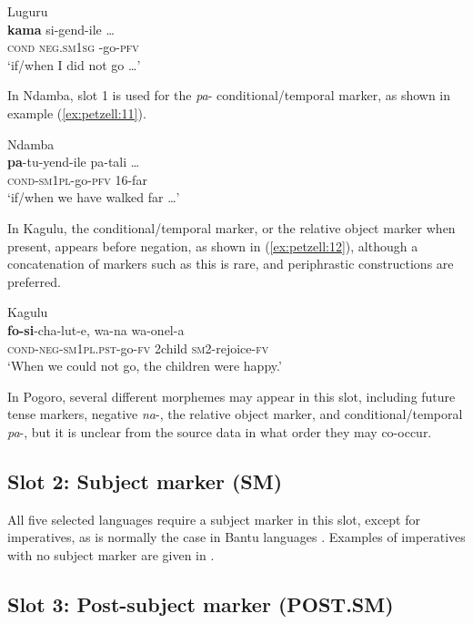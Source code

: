 \documentclass[output=paper,
            colorlinks, citecolor=brown
            ,draftmode
		  ]{langscibook}
\begin{document}
\ex\label{ex:petzell:10}Luguru\\
\gll \textbf{kama}   si-gend-ile \ldots\\
\textsc{cond}  \textsc{neg.sm}1\textsc{sg} -go-\textsc{pfv} \\
\glt `if/when I did not go \ldots'
\z


In Ndamba, slot 1 is used for the \textit{pa}{}- conditional/temporal marker, as shown in example (\ref{ex:petzell:11}).


\ea\label{ex:petzell:11}Ndamba\\
\gll \textbf{pa}{}-tu-yend-ile        pa-tali \ldots\\
\textsc{cond}{}-\textsc{sm1pl}{}-go-\textsc{pfv} {16-far}\\
\glt `if/when we have walked far \ldots'
\z



In Kagulu, the conditional/temporal marker, or the relative object marker when present, appears before negation, as shown in  (\ref{ex:petzell:12}), although a concatenation of markers such as this is rare, and periphrastic constructions are preferred.


\ea\label{ex:petzell:12}Kagulu\\
\gll \textbf{fo-si}{}-cha-lut-e,                         wa-na      wa-onel-a\\
{\textsc{cond}}{{}-}\textsc{{neg}}{}-\textsc{sm}1\textsc{pl}.\textsc{pst}{}-go-\textsc{fv}     2child     \textsc{sm}2-rejoice-\textsc{fv}\\
\glt `When we could not go, the children were happy.'
\z


In Pogoro, several different morphemes may appear in this slot, including future tense markers, negative \textit{na}{}-, the relative object marker, and conditional\slash temporal \textit{pa}{}-, but it is unclear from the source data in what order they may co-occur.


\subsection{Slot 2: Subject marker (SM)}\label{sec:petzell:2.2}

All five selected languages require a subject marker in this slot, except for imperatives, as is normally the case in Bantu languages \citep[108]{Meeussen1967}. Examples of imperatives with no subject marker are given in  .


\subsection{Slot 3: Post-subject marker (POST.SM)}\label{sec:petzell:2.3}
\end{document}
